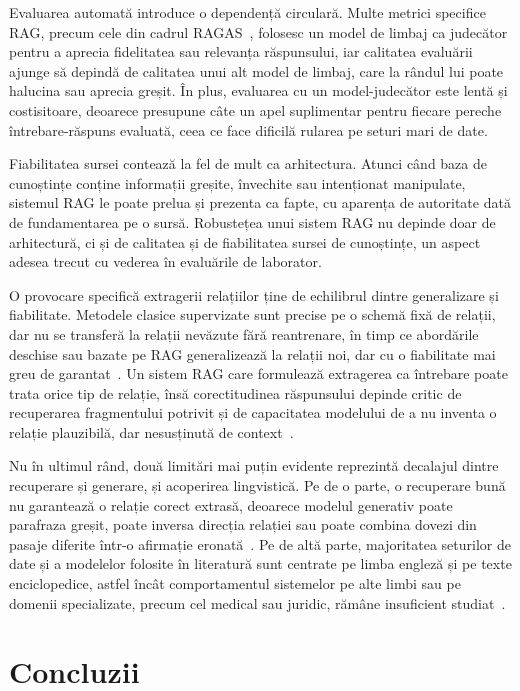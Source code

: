 Evaluarea automată introduce o dependență circulară. Multe metrici specifice RAG, precum cele din cadrul RAGAS~\cite{es2024ragas}, folosesc un model de limbaj ca judecător pentru a aprecia fidelitatea sau relevanța răspunsului, iar calitatea evaluării ajunge să depindă de calitatea unui alt model de limbaj, care la rândul lui poate halucina sau aprecia greșit. În plus, evaluarea cu un model-judecător este lentă și costisitoare, deoarece presupune câte un apel suplimentar pentru fiecare pereche întrebare-răspuns evaluată, ceea ce face dificilă rularea pe seturi mari de date.

Fiabilitatea sursei contează la fel de mult ca arhitectura. Atunci când baza de cunoștințe conține informații greșite, învechite sau intenționat manipulate, sistemul RAG le poate prelua și prezenta ca fapte, cu aparența de autoritate dată de fundamentarea pe o sursă. Robustețea unui sistem RAG nu depinde doar de arhitectură, ci și de calitatea și de fiabilitatea sursei de cunoștințe, un aspect adesea trecut cu vederea în evaluările de laborator.

O provocare specifică extragerii relațiilor ține de echilibrul dintre generalizare și fiabilitate. Metodele clasice supervizate sunt precise pe o schemă fixă de relații, dar nu se transferă la relații nevăzute fără reantrenare, în timp ce abordările deschise sau bazate pe RAG generalizează la relații noi, dar cu o fiabilitate mai greu de garantat~\cite{levy2017zeroshot}. Un sistem RAG care formulează extragerea ca întrebare poate trata orice tip de relație, însă corectitudinea răspunsului depinde critic de recuperarea fragmentului potrivit și de capacitatea modelului de a nu inventa o relație plauzibilă, dar nesusținută de context~\cite{asai2023self}.

Nu în ultimul rând, două limitări mai puțin evidente reprezintă decalajul dintre recuperare și generare, și acoperirea lingvistică. Pe de o parte, o recuperare bună nu garantează o relație corect extrasă, deoarece modelul generativ poate parafraza greșit, poate inversa direcția relației sau poate combina dovezi din pasaje diferite într-o afirmație eronată~\cite{yao2019docred}. Pe de altă parte, majoritatea seturilor de date și a modelelor folosite în literatură sunt centrate pe limba engleză și pe texte enciclopedice, astfel încât comportamentul sistemelor pe alte limbi sau pe domenii specializate, precum cel medical sau juridic, rămâne insuficient studiat~\cite{gao2024retrievalaugmentedgenerationlargelanguage}.

\section{Concluzii}


